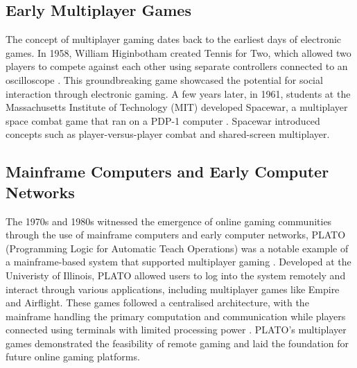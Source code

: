 \subsection{Early Multiplayer Games}
The concept of multiplayer gaming dates back to the earliest days of electronic games. In 1958, William Higinbotham created Tennis for Two, which allowed two players to compete against each other using separate controllers connected to an oscilloscope \cite{arm2006networking}. This groundbreaking game showcased the potential for social interaction through electronic gaming. A few years later, in 1961, students at the Massachusetts Institute of Technology (MIT) developed Spacewar, a multiplayer space combat game that ran on a PDP-1 computer \cite{arm2006networking}. Spacewar introduced concepts such as player-versus-player combat and shared-screen multiplayer.

\subsection{Mainframe Computers and Early Computer Networks}
The 1970s and 1980s witnessed the emergence of online gaming communities through the use of mainframe computers and early computer networks, PLATO (Programming Logic for Automatic Teach Operations) was a notable example of a mainframe-based system that supported multiplayer gaming \cite{arm2006networking}. Developed at the Univeristy of Illinois, PLATO allowed users to log into the system remotely and interact through various applications, including multiplayer games like Empire and Airflight. These games followed a centralised architecture, with the mainframe handling the primary computation and communication while players connected using terminals with limited processing power \cite{arm2006networking}. PLATO's multiplayer games demonstrated the feasibility of remote gaming and laid the foundation for future online gaming platforms. 

